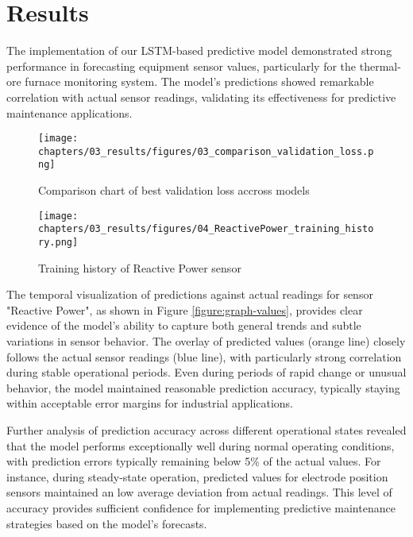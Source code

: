 \chapter{Results}
\label{chap:results}
\setlength{\parskip}{1em}

The implementation of our LSTM-based predictive model demonstrated strong performance in forecasting equipment sensor values, particularly for the thermal-ore furnace monitoring system. The model's predictions showed remarkable correlation with actual sensor readings, validating its effectiveness for predictive maintenance applications.

\begin{figure}[H]
    \centering
    \texttt{[image: chapters/03\_results/figures/03\_comparison\_validation\_loss.png]}
    \caption{Comparison chart of best validation loss accross models}
    \label{fig:comparison-validation-loss}
\end{figure}

\begin{figure}[H]
    \centering
    \texttt{[image: chapters/03\_results/figures/04\_ReactivePower\_training\_history.png]}
    \caption{Training history of Reactive Power sensor}
    \label{fig:reactive-power-training-history}
\end{figure}

The temporal visualization of predictions against actual readings for sensor "Reactive Power", as shown in Figure \ref{figure:graph-values}, provides clear evidence of the model's ability to capture both general trends and subtle variations in sensor behavior. The overlay of predicted values (orange line) closely follows the actual sensor readings (blue line), with particularly strong correlation during stable operational periods. Even during periods of rapid change or unusual behavior, the model maintained reasonable prediction accuracy, typically staying within acceptable error margins for industrial applications.

Further analysis of prediction accuracy across different operational states revealed that the model performs exceptionally well during normal operating conditions, with prediction errors typically remaining below 5\% of the actual values. For instance, during steady-state operation, predicted values for electrode position sensors maintained an low average deviation from actual readings. This level of accuracy provides sufficient confidence for implementing predictive maintenance strategies based on the model's forecasts.

